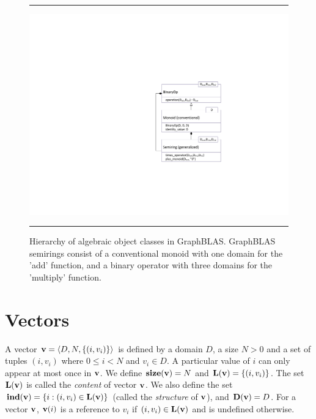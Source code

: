 \begin{figure}[htb]
    \hrule
    \begin{center}
        \includegraphics[width=1.0\linewidth,trim=3in 2in 0.5in 2in]{Algebra_Hierarchy_v2_1.pdf}
    \end{center}
    \caption{Hierarchy of algebraic object classes in GraphBLAS. GraphBLAS semirings consist of a conventional monoid with one domain for the 'add' function, and a binary operator with three domains for the 'multiply' function.}
    \label{Fig:AlgebraHierarchy}
    \hrule
\end{figure}

\section{Vectors}
\label{Sec:Vectors}

A vector ${\bf v} = \langle D, N, \{ (i,v_i) \} \rangle$ is defined by
a domain $D$, a size $N>0$ and a set of tuples $(i,v_i)$ where $0 \leq
i < N$ and $v_i \in D$. A particular value of $i$ can only appear at
most once in ${\bf v}$. We define $\mathbf{size}({\bf v}) = N$ and
$\mathbf{L}({\bf v}) = \{ (i,v_i) \}$. The set $\mathbf{L}({\bf v})$ is
called the \emph{content} of vector ${\bf v}$. We also define the set
${\bf ind({\bf v})} = \{ i : (i,v_i) \in \mathbf{L}({\bf v}) \}$
(called the \emph{structure} of ${\bf v}$), and $\mathbf{D}({\bf v})
= D$. For a vector ${\bf v}$, ${\bf v}(i)$ is a reference to $v_i$
if $(i,v_i) \in \mathbf{L}({\bf v})$ and is undefined otherwise.

